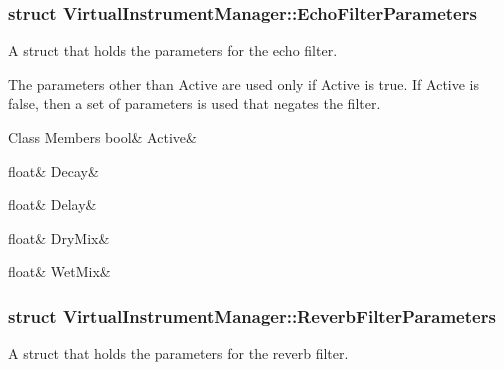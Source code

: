 \subsubsection{struct Virtual\+Instrument\+Manager\+:\+:Echo\+Filter\+Parameters}
A struct that holds the parameters for the echo filter. 

The parameters other than Active are used only if Active is true. If Active is false, then a set of parameters is used that negates the filter. \begin{DoxyFields}{Class Members}
\mbox{\label{group___event_types_adbed98a4cc0e2688edabbadfba58a18b}} 
bool&
Active&
\\
\hline

\mbox{\label{group___event_types_a7e529eb3e4de120daabef80608dcde27}} 
float&
Decay&
\\
\hline

\mbox{\label{group___event_types_a2594ca005d747a272e4aa411bef21f6e}} 
float&
Delay&
\\
\hline

\mbox{\label{group___event_types_ab192892df9a03c86b8ce93be434f75be}} 
float&
DryMix&
\\
\hline

\mbox{\label{group___event_types_a654d4a14431e8c8758f3f58a97d1e61f}} 
float&
WetMix&
\\
\hline

\end{DoxyFields}
\label{struct_virtual_instrument_manager_1_1_reverb_filter_parameters}
\subsubsection{struct Virtual\+Instrument\+Manager\+:\+:Reverb\+Filter\+Parameters}
A struct that holds the parameters for the reverb filter. 


